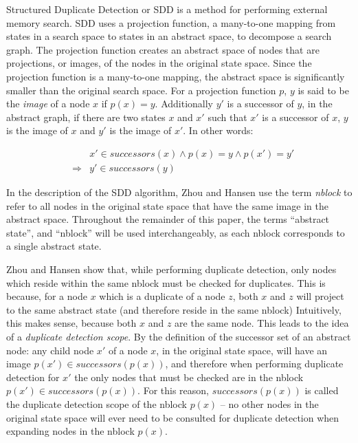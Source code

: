 \documentclass{article}
\begin{document}
Structured Duplicate Detection or SDD \cite{zhou:sdd} is a method for
performing external memory search.  SDD uses a projection function, a
many-to-one mapping from states in a search space to states in an
abstract space, to decompose a search graph.  The projection function
creates an abstract space of nodes that are projections, or images, of
the nodes in the original state space.  Since the projection function
is a many-to-one mapping, the abstract space is significantly smaller
than the original search space.  For a projection function $p$, $y$ is
said to be the \emph{image} of a node $x$ if $p(x) = y$.  Additionally
$y'$ is a successor of $y$, in the abstract graph, if there are two
states $x$ and $x'$ such that $x'$ is a successor of $x$, $y$ is the
image of $x$ and $y'$ is the image of $x'$.  In other words:

\begin{eqnarray*}
&&x' \in successors(x) \wedge p(x) = y \wedge p(x') = y' \\
&\Rightarrow& y' \in successors(y)
\end{eqnarray*}

In the description of the SDD algorithm, Zhou and Hansen use the term
\emph{nblock} to refer to all nodes in the original state space that
have the same image in the abstract space.  Throughout the remainder
of this paper, the terms ``abstract state'', and ``nblock'' will be
used interchangeably, as each nblock corresponds to a single abstract
state.

Zhou and Hansen show that, while performing duplicate detection, only
nodes which reside within the same nblock must be checked for
duplicates.  This is because, for a node $x$ which is a duplicate of a
node $z$, both $x$ and $z$ will project to the same abstract state
(and therefore reside in the same nblock) Intuitively, this makes
sense, because both $x$ and $z$ are the same node.  This leads to the
idea of a \emph{duplicate detection scope}.  By the definition of the
successor set of an abstract node: any child node $x'$ of a node $x$,
in the original state space, will have an image $p(x') \in
successors(p(x))$, and therefore when performing duplicate detection
for $x'$ the only nodes that must be checked are in the nblock $p(x')
\in successors(p(x))$.  For this reason, $successors(p(x))$ is called
the duplicate detection scope of the nblock $p(x)$ -- no other nodes
in the original state space will ever need to be consulted for
duplicate detection when expanding nodes in the nblock $p(x)$.
\end{document}
